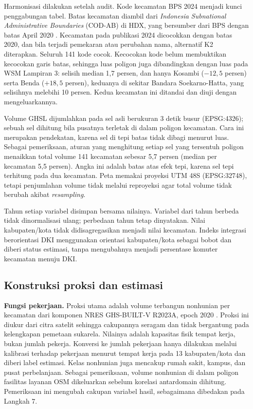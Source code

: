 \documentclass[12pt,a4paper,oneside,openany,indonesian]{report}
\begin{document}
Harmonisasi dilakukan setelah audit. Kode kecamatan BPS 2024 menjadi
kunci penggabungan tabel. Batas kecamatan diambil dari \emph{Indonesia
Subnational Administrative Boundaries} (COD-AB) di HDX, yang bersumber
dari BPS dengan batas April 2020 \parencite{hdxcodab2020}. Kecamatan
pada publikasi 2024 dicocokkan dengan batas 2020, dan bila terjadi
pemekaran atau perubahan nama, alternatif K2 diterapkan. Seluruh 141 kode
cocok. Kecocokan kode belum membuktikan kecocokan garis batas, sehingga
luas poligon juga dibandingkan dengan luas pada WSM Lampiran 3: selisih
median 1,7 persen, dan hanya Kosambi ($-12{,}5$ persen) serta Benda
($+18{,}5$ persen), keduanya di sekitar Bandara Soekarno-Hatta, yang
selisihnya melebihi 10 persen. Kedua kecamatan ini ditandai dan diuji
dengan mengeluarkannya.

Volume GHSL dijumlahkan pada sel asli berukuran 3 detik busur
(EPSG:4326); sebuah sel dihitung bila pusatnya terletak di dalam poligon
kecamatan. Cara ini merupakan pendekatan, karena sel di tepi batas tidak
dibagi menurut luas. Sebagai pemeriksaan, aturan yang menghitung setiap
sel yang tersentuh poligon menaikkan total volume 141 kecamatan sebesar
5,7 persen (median per kecamatan 5,5 persen). Angka ini adalah batas
atas efek tepi, karena sel tepi terhitung pada dua kecamatan. Peta
memakai proyeksi UTM 48S (EPSG:32748), tetapi penjumlahan volume tidak
melalui reproyeksi agar total volume tidak berubah akibat
\emph{resampling}.

Tahun setiap variabel disimpan bersama nilainya. Variabel dari tahun
berbeda tidak dinormalisasi ulang; perbedaan tahun tetap dinyatakan.
Nilai kabupaten/kota tidak didisagregasikan menjadi nilai kecamatan.
Indeks integrasi berorientasi DKI menggunakan orientasi kabupaten/kota
sebagai bobot dan diberi status estimasi, tanpa mengubahnya menjadi
persentase komuter kecamatan menuju DKI.

\subsection{Konstruksi proksi dan
estimasi}\label{konstruksi-proksi-dan-estimasi}

\textbf{Fungsi pekerjaan.} Proksi utama adalah volume terbangun
nonhunian per kecamatan dari komponen NRES GHS-BUILT-V R2023A, epoch
2020 \parencite{ghsl2023builtv}. Proksi ini diukur dari citra satelit
sehingga cakupannya seragam dan tidak bergantung pada kelengkapan
pemetaan sukarela. Nilainya adalah kapasitas fisik tempat kerja, bukan
jumlah pekerja. Konversi ke jumlah pekerjaan hanya dilakukan melalui
kalibrasi terhadap pekerjaan menurut tempat kerja pada 13
kabupaten/kota dan diberi label estimasi. Kelas nonhunian juga mencakup
rumah sakit, kampus, dan pusat perbelanjaan. Sebagai pemeriksaan,
volume nonhunian di dalam poligon fasilitas layanan OSM dikeluarkan
sebelum korelasi antardomain dihitung. Pemeriksaan ini mengubah cakupan
variabel hasil, sebagaimana dibedakan pada Langkah 7.
\end{document}
